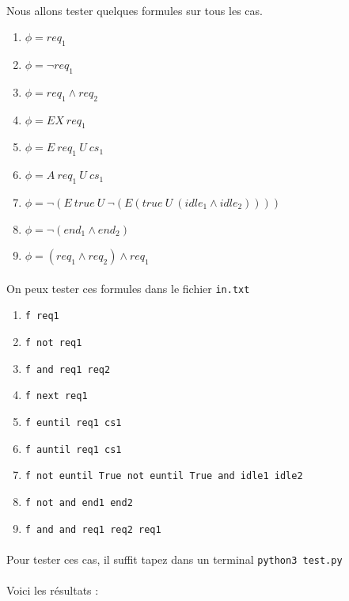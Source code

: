 \documentclass[12pt,a4paper]{report}
\begin{document}
\paragraph{}Nous allons tester quelques formules sur tous les cas.
\begin{enumerate}
    \item $\phi = req_{1}$
    \item $\phi = \neg req_{1}$
    \item $\phi = req_{1} \land req_{2}$
    \item $\phi = EX\ req_{1}$
    \item $\phi = E\ req_{1}\ U\ cs_{1}$
    \item $\phi = A\ req_{1}\ U\ cs_{1}$
    \item $\phi = \neg(E\ true\ U\ \neg(E(true\ U\ (idle_{1}\land idle_{2}))))$
    \item $\phi = \neg(end_{1}\land end_{2})$
    \item $\phi = (req_{1}\land req_{2})\land req_{1}$
\end{enumerate}

\paragraph{}On peux tester ces formules dans le fichier \verb+in.txt+ 
\begin{enumerate}
    \item \verb+f req1+
    \item \verb+f not req1+
    \item \verb+f and req1 req2+
    \item \verb+f next req1+
    \item \verb+f euntil req1 cs1+
    \item \verb+f auntil req1 cs1+
    \item \verb+f not euntil True not euntil True and idle1 idle2+
    \item \verb+f not and end1 end2+
    \item \verb+f and and req1 req2 req1+
\end{enumerate}

\paragraph{}Pour tester ces cas, il suffit tapez dans un terminal \verb+python3 test.py+

\paragraph{}Voici les résultats :
\end{document}
